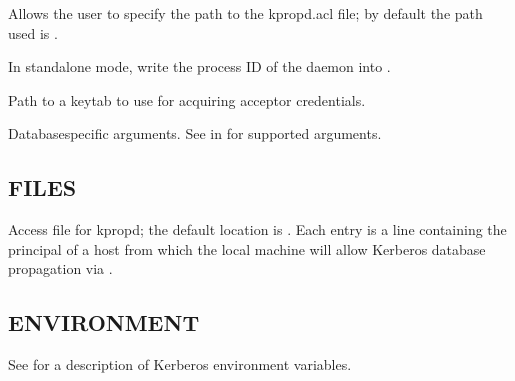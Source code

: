 \documentclass[letterpaper,10pt,english]{sphinxmanual}
\begin{document}
\begin{description}
\sphinxAtStartPar
Allows the user to specify the path to the kpropd.acl file; by
default the path used is {\hyperref[\detokenize{mitK5defaults:paths}]{}}.

\sphinxAtStartPar
In standalone mode, write the process ID of the daemon into
.

\sphinxAtStartPar
Path to a keytab to use for acquiring acceptor credentials.

\sphinxAtStartPar
Database\sphinxhyphen{}specific arguments.  See {\hyperref[\detokenize{admin/admin_commands/kadmin_local:dboptions}]{}} in {\hyperref[\detokenize{admin/admin_commands/kadmin_local:kadmin-1}]{}} for supported arguments.

\end{description}


\subsection{FILES}
\label{\detokenize{admin/admin_commands/kpropd:files}}\begin{description}
\sphinxAtStartPar
Access file for kpropd; the default location is
.  Each entry is a line
containing the principal of a host from which the local machine
will allow Kerberos database propagation via {\hyperref[\detokenize{admin/admin_commands/kprop:kprop-8}]{}}.

\end{description}


\subsection{ENVIRONMENT}
\label{\detokenize{admin/admin_commands/kpropd:environment}}
\sphinxAtStartPar
See  for a description of Kerberos environment
variables.
\end{document}
